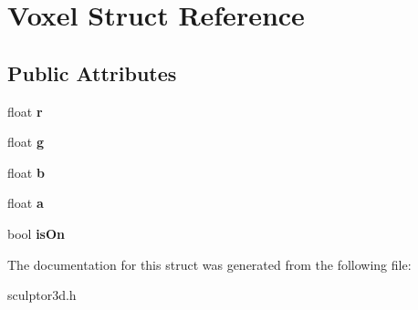 \hypertarget{struct_voxel}{}\section{Voxel Struct Reference}
\label{struct_voxel}
\subsection*{Public Attributes}
\begin{DoxyCompactItemize}
\item 
\mbox{\label{struct_voxel_a06872ec79b836120b551a848968c0f1b}} 
float {\bfseries r}
\item 
\mbox{\label{struct_voxel_a27c0da1ed2ff430401d23ff171612a73}} 
float {\bfseries g}
\item 
\mbox{\label{struct_voxel_a5cd8432b1d7d0fd8b79e0fc7d10373a8}} 
float {\bfseries b}
\item 
\mbox{\label{struct_voxel_a3ce2579eb0a9f09a07112ce7498a638e}} 
float {\bfseries a}
\item 
\mbox{\label{struct_voxel_a6fbe8bd53f64685ac4210726d40fc775}} 
bool {\bfseries is\+On}
\end{DoxyCompactItemize}


The documentation for this struct was generated from the following file\+:\begin{DoxyCompactItemize}
\item 
sculptor3d.\+h\end{DoxyCompactItemize}
